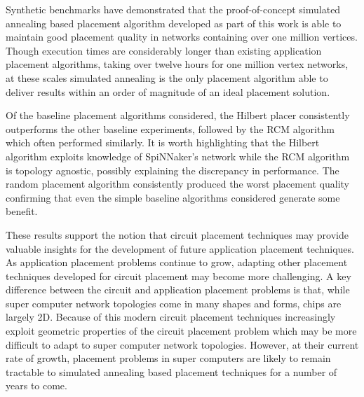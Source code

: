 		Synthetic benchmarks have demonstrated that the proof-of-concept simulated
		annealing based placement algorithm developed as part of this work is able
		to maintain good placement quality in networks containing over one million
		vertices. Though execution times are considerably longer than existing
		application placement algorithms, taking over twelve hours for one million
		vertex networks, at these scales simulated annealing is the only placement
		algorithm able to deliver results within an order of magnitude of an ideal
		placement solution.
		
		Of the baseline placement algorithms considered, the Hilbert placer
		consistently outperforms the other baseline experiments, followed by the
		RCM algorithm which often performed similarly. It is worth highlighting
		that the Hilbert algorithm exploits knowledge of SpiNNaker's network while
		the RCM algorithm is topology agnostic, possibly explaining the discrepancy
		in performance. The random placement algorithm consistently produced the
		worst placement quality confirming that even the simple baseline algorithms
		considered generate some benefit.
		
		These results support the notion that circuit placement techniques may
		provide valuable insights for the development of future application
		placement techniques. As application placement problems continue to grow,
		adapting other placement techniques developed for circuit placement may
		become more challenging. A key difference between the circuit and
		application placement problems is that, while super computer network
		topologies come in many shapes and forms, chips are largely 2D.  Because of
		this modern circuit placement techniques increasingly exploit geometric
		properties of the circuit placement problem which may be more difficult to
		adapt to super computer network topologies.  However, at their current rate
		of growth, placement problems in super computers are likely to remain
		tractable to simulated annealing based placement techniques for a number of
		years to come. 
